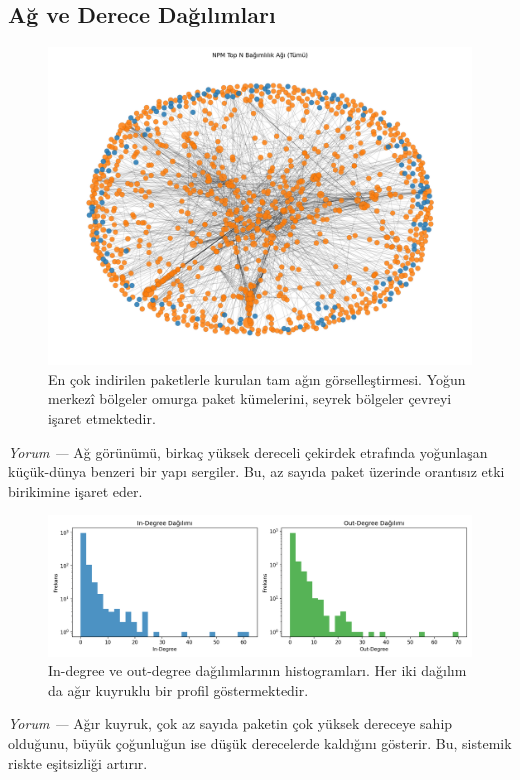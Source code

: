 \documentclass[11pt,a4paper]{article}
\begin{document}
\subsection{Ağ ve Derece Dağılımları}
\begin{figure}[H]
  \centering
  \includegraphics{network_full_topN.png}
  \caption{En çok indirilen paketlerle kurulan tam ağın görselleştirmesi. Yoğun merkezî bölgeler omurga paket kümelerini, seyrek bölgeler çevreyi işaret etmektedir.}
\end{figure}
\textit{Yorum —} Ağ görünümü, birkaç yüksek dereceli çekirdek etrafında yoğunlaşan küçük-dünya benzeri bir yapı sergiler. Bu, az sayıda paket üzerinde orantısız etki birikimine işaret eder.

\begin{figure}[H]
  \centering
  \includegraphics{degree_histograms.png}
  \caption{In-degree ve out-degree dağılımlarının histogramları. Her iki dağılım da ağır kuyruklu bir profil göstermektedir.}
\end{figure}
\textit{Yorum —} Ağır kuyruk, çok az sayıda paketin çok yüksek dereceye sahip olduğunu, büyük çoğunluğun ise düşük derecelerde kaldığını gösterir. Bu, sistemik riskte eşitsizliği artırır.
\end{document}
